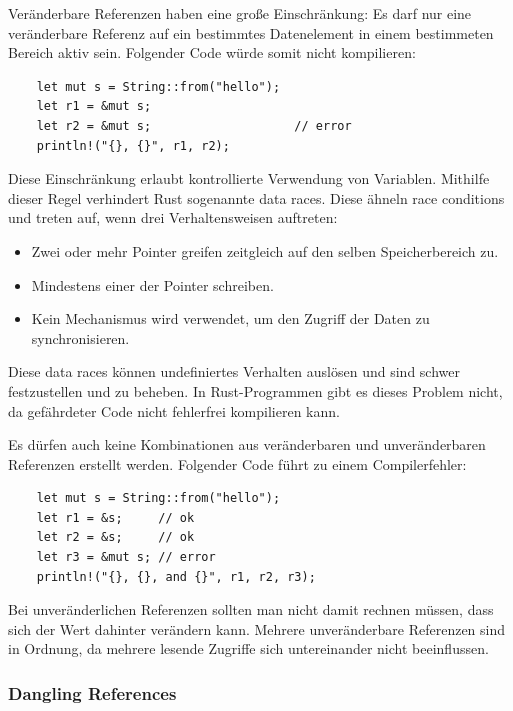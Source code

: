 Veränderbare Referenzen haben eine große Einschränkung: Es darf nur eine veränderbare Referenz auf ein bestimmtes Datenelement in einem bestimmeten Bereich aktiv sein. Folgender Code würde somit nicht kompilieren:

\begin{lstlisting}
    let mut s = String::from("hello");
    let r1 = &mut s;
    let r2 = &mut s;                    // error
    println!("{}, {}", r1, r2);
\end{lstlisting}

Diese Einschränkung erlaubt kontrollierte Verwendung von Variablen. Mithilfe dieser Regel verhindert Rust sogenannte \glqq data races\grqq{}. Diese ähneln \glqq race conditions\grqq{} und treten auf, wenn drei Verhaltensweisen auftreten:

\begin{itemize}
    \item Zwei oder mehr Pointer greifen zeitgleich auf den selben Speicherbereich zu.
    \item Mindestens einer der Pointer schreiben.
    \item Kein Mechanismus wird verwendet, um den Zugriff der Daten zu synchronisieren.
\end{itemize}

Diese \glqq data races\grqq{} können undefiniertes Verhalten auslösen und sind schwer festzustellen und zu beheben. In Rust-Programmen gibt es dieses Problem nicht, da gefährdeter Code nicht fehlerfrei kompilieren kann.

Es dürfen auch keine Kombinationen aus veränderbaren und unveränderbaren Referenzen erstellt werden. Folgender Code führt zu einem Compilerfehler:

\begin{lstlisting}
    let mut s = String::from("hello");
    let r1 = &s;     // ok
    let r2 = &s;     // ok
    let r3 = &mut s; // error
    println!("{}, {}, and {}", r1, r2, r3);
\end{lstlisting}

Bei unveränderlichen Referenzen sollten man nicht damit rechnen müssen, dass sich der Wert dahinter verändern kann. Mehrere unveränderbare Referenzen sind in Ordnung, da mehrere lesende Zugriffe sich untereinander nicht beeinflussen.

\subsubsection{\glqq Dangling References\grqq{}}

